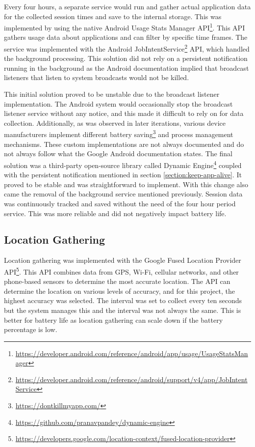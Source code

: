 \documentclass{l4proj}
\begin{document}
Every four hours, a separate service would run and gather actual application data for the collected session times and save to the internal storage. This was implemented by using the native Android Usage Stats Manager API\footnote{\url{https://developer.android.com/reference/android/app/usage/UsageStatsManager}}. This API gathers usage data about applications and can filter by specific time frames. The service was implemented with the Android JobIntentService\footnote{\url{https://developer.android.com/reference/android/support/v4/app/JobIntentService}} API, which handled the background processing. This solution did not rely on a persistent notification running in the background as the Android documentation implied that broadcast listeners that listen to system broadcasts would not be killed.

This initial solution proved to be unstable due to the broadcast listener implementation. The Android system would occasionally stop the broadcast listener service without any notice, and this made it difficult to rely on for data collection. Additionally, as was observed in later iterations, various device manufacturers implement different battery saving\footnote{\url{https://dontkillmyapp.com/}} and process management mechanisms. These custom implementations are not always documented and do not always follow what the Google Android documentation states. The final solution was a third-party open-source library called Dynamic  Engine\footnote{\url{https://github.com/pranavpandey/dynamic-engine}} coupled with the persistent notification mentioned in section \ref{section:keep-app-alive}. It proved to be stable and was straightforward to implement. With this change also came the removal of the background service mentioned previously. Session data was continuously tracked and saved without the need of the four hour period service. This was more reliable and did not negatively impact battery life.


\subsection{Location Gathering}
Location gathering was implemented with the Google Fused Location Provider API\footnote{\url{https://developers.google.com/location-context/fused-location-provider}}. This API combines data from GPS, Wi-Fi, cellular networks, and other phone-based sensors to determine the most accurate location. The API can determine the location on various levels of accuracy, and for this project, the highest accuracy was selected. The interval was set to collect every ten seconds but the system manages this and the interval was not always the same. This is better for battery life as location gathering can scale down if the battery percentage is low.
\end{document}

